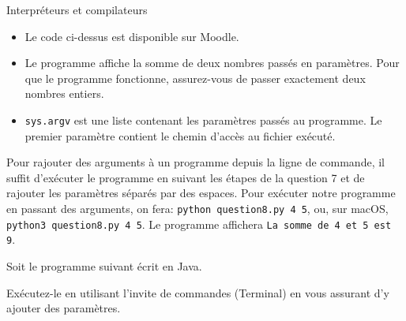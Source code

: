 \begin{section}{Interpréteurs et compilateurs}
\begin{Exercice}[10 minutes]
        
        
        \begin{conseil}
            \begin{itemize}
                \item Le code ci-dessus est disponible sur Moodle.
                \item Le programme affiche la somme de deux nombres passés en paramètres. Pour que le programme fonctionne, assurez-vous de passer exactement deux nombres entiers.
                \item \lstinline{sys.argv} est une liste contenant les paramètres passés au programme. Le premier paramètre contient le chemin d'accès au fichier exécuté.
            \end{itemize}
        \end{conseil}

        \begin{solution}
            Pour rajouter des arguments à un programme depuis la ligne de commande, il suffit d'exécuter le programme en suivant les étapes de la question 7 et de rajouter les paramètres séparés par des espaces. Pour exécuter notre programme en passant des arguments, on fera: \lstinline{python question8.py 4 5}, ou, sur macOS, \lstinline{python3 question8.py 4 5}. Le programme affichera \lstinline{La somme de 4 et 5 est 9}.
        \end{solution}

    \end{Exercice}
    \begin{Exercice}[10 minutes]
        Soit le programme suivant écrit en Java. 

        
        
        Exécutez-le en utilisant l'invite de commandes (Terminal) en vous assurant d'y ajouter des paramètres.
    


\end{Exercice}
\end{section}
